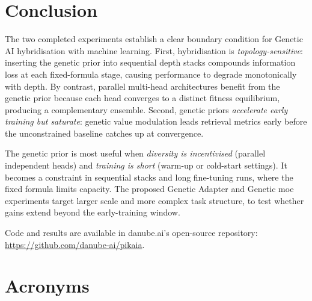 \documentclass[10pt, a4paper, twocolumn]{article}
\begin{document}
\section{Conclusion}

The two completed experiments establish a clear boundary condition for Genetic AI hybridisation with machine learning. First, hybridisation is \emph{topology-sensitive}: inserting the genetic prior into sequential depth stacks compounds information loss at each fixed-formula stage, causing performance to degrade monotonically with depth. By contrast, parallel multi-head architectures benefit from the genetic prior because each head converges to a distinct fitness equilibrium, producing a complementary ensemble. Second, genetic priors \emph{accelerate early training but saturate}: genetic value modulation leads retrieval metrics early before the unconstrained baseline catches up at convergence.

The genetic prior is most useful when \emph{diversity is incentivised} (parallel independent heads) and \emph{training is short} (warm-up or cold-start settings). It becomes a constraint in sequential stacks and long fine-tuning runs, where the fixed formula limits capacity. The proposed Genetic Adapter and Genetic \acs{moe} experiments target larger scale and more complex task structure, to test whether gains extend beyond the early-training window.

Code and results are available in danube.ai's open-source repository: \url{https://github.com/danube-ai/pikaia}.

\clearpage
\onecolumn
\section*{Acronyms}
\printacronyms[heading=none]
\clearpage


\end{document}
